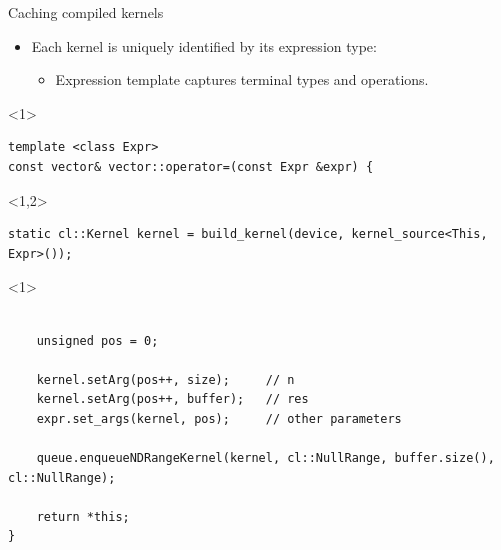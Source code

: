 \documentclass[@BEAMER_OPTIONS@]{beamer}
\begin{document}
\note{ }

\begin{frame}[fragile]{Caching compiled kernels}
    \begin{itemize}
        \item Each kernel is uniquely identified by its expression type:
            \begin{itemize}
                \item Expression template captures terminal types and
                    operations.
            \end{itemize}
    \end{itemize}
    \begin{exampleblock}{}
        \begin{uncoverenv}<1>
            \begin{lstlisting}
template <class Expr>
const vector& vector::operator=(const Expr &expr) {
            \end{lstlisting}
        \end{uncoverenv}
        \begin{uncoverenv}<1,2>
            \begin{lstlisting}[firstnumber=last]
    static cl::Kernel kernel = build_kernel(device, kernel_source<This, Expr>());
            \end{lstlisting}
        \end{uncoverenv}
        \begin{uncoverenv}<1>
            \begin{lstlisting}[firstnumber=last]

    unsigned pos = 0;

    kernel.setArg(pos++, size);     // n
    kernel.setArg(pos++, buffer);   // res
    expr.set_args(kernel, pos);     // other parameters

    queue.enqueueNDRangeKernel(kernel, cl::NullRange, buffer.size(), cl::NullRange);

    return *this;
}
            \end{lstlisting}
        \end{uncoverenv}
    \end{exampleblock}
\end{frame}

\note{ }
\end{document}
